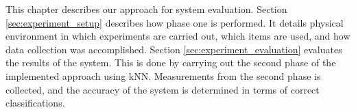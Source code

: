 This chapter describes our approach for system evaluation. 
Section \ref{sec:experiment_setup} describes how phase one is performed.
It details physical environment in which experiments are carried out, which items are used, and how data collection was accomplished.
Section \ref{sec:experiment_evaluation} evaluates the results of the system. 
This is done by carrying out the second phase of the implemented approach using kNN. 
Measurements from the second phase is collected, and the accuracy of the system is determined in terms of correct classifications. 